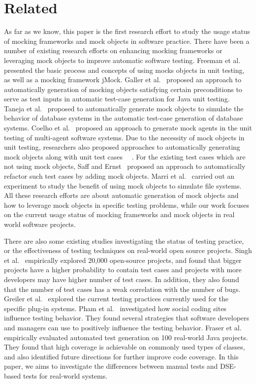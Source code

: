\section{Related}
\label{sec:relatedmock}

As far as we know, this paper is the first research effort to study the usage status of mocking frameworks and mock objects in software practice. There have been a number of existing research efforts on enhancing mocking frameworks or leveraging mock objects to improve automatic software testing. Freeman et al.~\cite{IEEEhowto:kopka}~\cite{Freeman} presented the basic process and concepts of using mocks objects in unit testing, as well as a mocking framework jMock. Galler et al.~\cite{Galler} proposed an approach to automatically generation of mocking objects satisfying certain preconditions to serve as test inputs in automatic test-case generation for Java unit testing. Taneja et al.~\cite{Taneja} proposed to automatically generate mock objects to simulate the behavior of database systems in the automatic test-case generation of database systems. Coelho et al.~\cite{Coelho} proposed an approach to generate mock agents in the unit testing of multi-agent software systems. Due to the necessity of mock objects in unit testing, researchers also proposed approaches to automatically generating mock objects along with unit test cases ~\cite{woda}~\cite{Pasternak}. For the existing test cases which are not using mock objects, Saff and Ernst~\cite{Saff} proposed an approach to automatically refactor such test cases by adding mock objects. Marri et al.~\cite{Marri} carried out an experiment to study the benefit of using mock objects to simulate file systems. All these research efforts are about automatic generation of mock objects and how to leverage mock objects in specific testing problems, while our work focuses on the current usage status of mocking frameworks and mock objects in real world software projects. 

There are also some existing studies investigating the status of testing practice, or the effectiveness of testing techniques on real-world open source projects. Singh et al.~\cite{singh2013empirical} empirically explored 20,000 open-source projects, and found that bigger projects have a higher probability to contain test cases and projects with more developers may have higher number of test cases. In addition, they also found that the number of test cases has a weak correlation with the number of bugs. Greiler et al.~\cite{greiler2012test} explored the current testing practices currently used for the specific plug-in systems. Pham et al.~\cite{pham2013creating} investigated how social coding sites influence testing behavior. They found several strategies that software developers and managers can use to positively influence the testing behavior. Fraser et al.~\cite{fraser2012sound} empirically evaluated automated test generation on 100 real-world Java projects. They found that high coverage is achievable on commonly used types of classes, and also identified future directions for further improve code coverage. In this paper, we aims to investigate the differences between manual tests and DSE-based tests for real-world systems.
